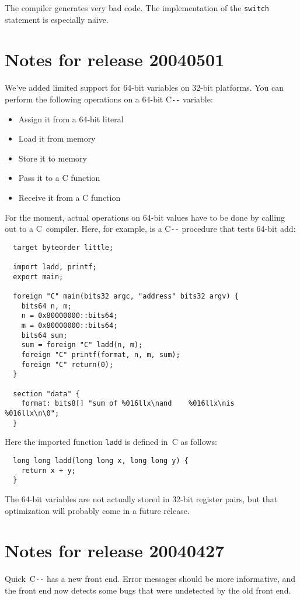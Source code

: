 \documentclass{article}
\def\PAL{\mbox{C{\texttt{-{}-}}}}
\begin{document}
The compiler generates very bad code.
The implementation of the \texttt{switch} statement is especially
na\"\i ve.


\section{Notes for release 20040501}

We've added limited support for 64-bit variables on 32-bit platforms.
You can perform the following operations on a 64-bit {\PAL} variable:
\begin{itemize}
\item Assign it from a 64-bit literal
\item   Load it from memory
\item    Store it to memory
\item   Pass it to a C function
\item   Receive it from a C function
\end{itemize}
For the moment, actual operations on 64-bit values have to be done by
calling out to a C~compiler.
Here, for example, is a {\PAL}
procedure that tests 64-bit add:
\begin{verbatim} 
  target byteorder little;
  
  import ladd, printf;
  export main;
  
  foreign "C" main(bits32 argc, "address" bits32 argv) {
    bits64 n, m;
    n = 0x80000000::bits64;
    m = 0x80000000::bits64;
    bits64 sum;
    sum = foreign "C" ladd(n, m);
    foreign "C" printf(format, n, m, sum);
    foreign "C" return(0);
  }

  section "data" {
    format: bits8[] "sum of %016llx\nand    %016llx\nis     %016llx\n\0";
  }
\end{verbatim}
Here the imported function \texttt{ladd} is defined in~C as follows:
\begin{verbatim} 
  long long ladd(long long x, long long y) {
    return x + y;
  }
\end{verbatim}
The 64-bit variables are not actually stored in 32-bit register pairs,
but that optimization will probably come in a future release.


\section{Notes for release 20040427}

Quick~{\PAL} has a new front end.
Error messages should be more informative, and the front end now
detects some bugs that were undetected by the old front end.
\end{document}
